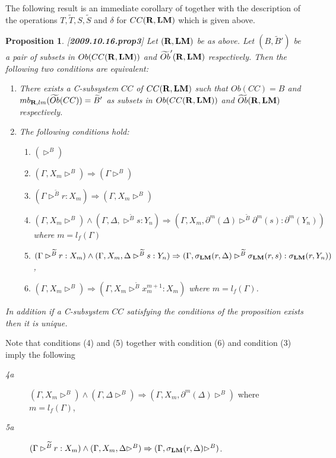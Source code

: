 \documentclass[11pt]{article}
\newtheorem{proposition}{Proposition}[subsection]
\newcommand{\llabel}[1]{\label{#1}[{\bf #1}]}
\newcommand{\rr}{{\bf R}}
\newcommand{\lm}{{\bf LM}}
\newcommand{\wt}{\widetilde}
\begin{document}
The following result is an immediate corollary of \cite[Proposition 4.3]{Csubsystems} together with the description of the operations $T,\wt{T},S,\wt{S}$ and $\delta$ for $CC(\rr,\lm)$ which is given above. 
%
\begin{proposition}
\llabel{2009.10.16.prop3}
Let $(\rr,\lm)$ be as above. Let $(B,\wt{B}')$ be a pair of subsets in $Ob(CC(\rr,\lm))$ and $\wt{Ob}'(\rr,\lm)$ respectively. Then the following two conditions are equivalent:
%
\begin{enumerate}
\item There exists a C-subsystem $CC$ of $CC(\rr,\lm)$ such that $Ob(CC)=B$ and $mb_{\rr,lm}(\wt{Ob}(CC))=\wt{B}'$ as subsets in $Ob(CC(\rr,\lm))$ and $\wt{Ob}(\rr,\lm)$ respectively.
\item The following conditions hold:
%
\begin{enumerate}
\item $(\rhd^{B})$
\item $(\Gamma, X_m\rhd^{B})\Rightarrow (\Gamma\rhd^{B})$
\item $(\Gamma\rhd^{\wt{B}} r:X_m)\Rightarrow (\Gamma,X_m\rhd^{B})$
\item $(\Gamma, X_m\rhd^{B})\wedge(\Gamma,\Delta,\rhd^{\wt{B}} s:Y_n)\Rightarrow  (\Gamma, X_m, \partial^{m}(\Delta)\rhd^{\wt{B}} \partial^{m} (s): \partial^{m}(Y_n))$
where $m=l_f(\Gamma)$
\item  $(\Gamma\rhd^{\wt{B}}  r:X_m)\wedge (\Gamma,X_m,\Delta\rhd^{\wt{B}} s:Y_n)\Rightarrow (\Gamma, \sigma_{\lm}(r,\Delta) \rhd^{\wt{B}} \sigma_{\lm}(r,s) : \sigma_{\lm}(r,Y_n))$ ,
%
\item $(\Gamma,X_m\rhd^{B})\Rightarrow (\Gamma,X_m\rhd^{\wt{B}} x_{m}^{m+1}:X_m)$ where $m=l_f(\Gamma)$.
\end{enumerate}
\end{enumerate}
%
In addition if a C-subsystem $CC$ satisfying the conditions of the proposition exists then it is unique.  
%
\end{proposition}
%
Note that conditions (4) and (5) together with condition (6) and condition (3) imply the following 
%
\begin{description}
\item[{\em 4a}] $(\Gamma, X_m\rhd^{B})\wedge (\Gamma,\Delta\rhd^{B})\Rightarrow (\Gamma, X_m, \partial^m(\Delta)\rhd^{B})$ where $m=l_f(\Gamma)$,
%
\item[{\em 5a}] $(\Gamma\rhd^{\wt{B}}  r:X_m)\wedge (\Gamma,X_m,\Delta\rhd^{B})\Rightarrow (\Gamma, \sigma_{\lm}(r,\Delta)\rhd^{B})$.
%
\end{description}
\end{document}
